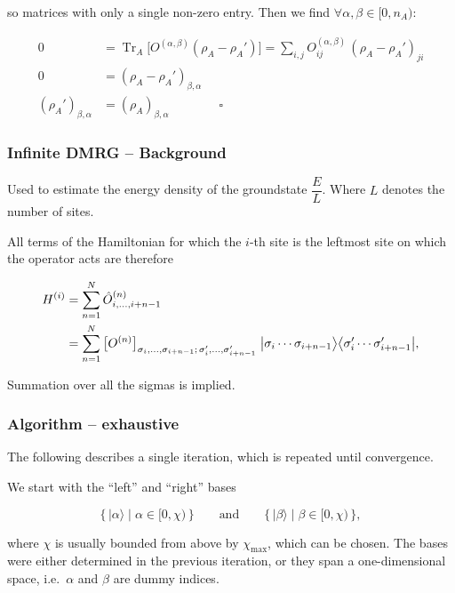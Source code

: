 so matrices with only a single non-zero entry. Then we find $\forall \alpha ,\beta \in [0,n_{A})$:

\begin{align}
0 &= \operatorname{Tr}_A\big[O^{(\alpha,\beta)}(\rho_A-\rho_A')\big] = \sum_{i,j}O^{(\alpha,\beta)}_{ij}\,(\rho_A-\rho_A')_{ji}\\
0 &= (\rho_A-\rho_A')_{\beta,\alpha}\\
(\rho_A')_{\beta,\alpha} &= (\rho_A)_{\beta,\alpha} \qquad\qquad\square
\end{align}

\subsubsection{Infinite DMRG -- Background}

Used to estimate the energy density of the groundstate $\dfrac{E}{L}$. 
Where $L$ denotes the number of sites.

All terms of the Hamiltonian for which the $i$-th site is the leftmost
site on which the operator acts are therefore

\begin{align}
H^{(i)} &= \sum_{n=1}^{N}\hat O^{(n)}_{i,\dots,i+n-1}\notag\\
&= \sum_{n=1}^{N}\big[O^{(n)}\big]_{\sigma_i,\dots,\sigma_{i+n-1};\,\sigma_i',\dots,\sigma_{i+n-1}'}\;
\big|\sigma_i\cdots\sigma_{i+n-1}\big\rangle\big\langle\sigma_i'\cdots\sigma_{i+n-1}'\big|,
\end{align}

Summation over all the sigmas is implied.

\subsubsection{Algorithm -- exhaustive}

The following describes a single iteration, which is repeated until
convergence.

We start with the ``left'' and ``right'' bases

\begin{equation}
\big\{\,|\alpha\rangle \;\big|\; \alpha\in[0,\chi)\,\big\}
\qquad\text{and}\qquad
\big\{\,|\beta\rangle \;\big|\; \beta\in[0,\chi)\,\big\},
\end{equation}

where $\chi$ is usually bounded from above by $\chi_{\max}$, which can
be chosen. The bases were either determined in the previous iteration,
or they span a one-dimensional space, i.e.\ $\alpha$ and $\beta$ are
dummy indices.

